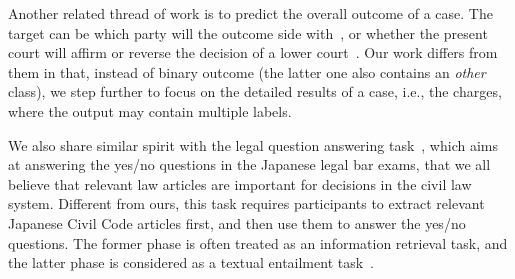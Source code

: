 Another related thread of work %
is to predict the overall outcome of a case. The target can be 
which party will the outcome side with~\cite{aletras2016predicting}, or whether the present court will affirm or reverse the decision of a lower court~\cite{katz2016general}. Our work differs from them in that, instead of binary outcome (the latter one also contains an \emph{other} class), we step further to focus on the detailed results of a case, i.e., the charges, where the output may contain multiple labels. 



We also share similar spirit with the legal question answering task~\cite{COLIEE14}, which aims at answering the yes/no questions in the Japanese legal bar exams, that we all believe that relevant law articles are important for decisions in the civil law system. 
Different from ours, this task requires participants to extract relevant Japanese Civil Code articles first, 
and then use them to answer the yes/no questions. 
The former phase is often treated as an information retrieval task, and the latter phase is considered as a textual entailment task~\cite{kim2014legal,carvalho2016lexical}. 

